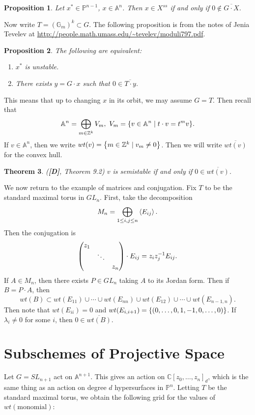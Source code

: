 \documentclass[leqno, openany]{memoir}
\newtheorem{thm}{Theorem}[section]
\newtheorem{prop}[thm]{Proposition}
\theoremstyle{definition}
\theoremstyle{remark}
\theoremstyle{plain}
\theoremstyle{definition}
\theoremstyle{remark}
\newcommand{\A}{\mathbb{A}}
\newcommand{\C}{\mathbb{C}}
\newcommand{\Z}{\mathbb{Z}}
\renewcommand{\P}{\mathbb{P}}
\newcommand{\ol}[1]{\overline{#1}}
\begin{document}
\begin{prop}
    Let $x^* \in \P^{n-1}$, $x \in \A^n$. Then $x \in X^{ss}$ if and only if $0 \notin \ol{G \cdot X}$.
\end{prop}

Now write $T = (\mathbb{G}_m)^k \subset G$. The following proposition is from the notes of Jenia Tevelev at \url{http://people.math.umass.edu/~tevelev/moduli797.pdf}.

\begin{prop}
    The following are equivalent:
    \begin{enumerate}
        \item $x^*$ is unstable.
        \item There exists $y = G \cdot x$ such that $0 \in \ol{T \cdot y}$.
    \end{enumerate}
\end{prop}

This means that up to changing $x$ in its orbit, we may assume $G = T$. Then recall that
\[ \A^n = \bigoplus_{m \in \Z^k} V_m,\ V_m = \qty{v \in \A^n \mid t \cdot v = t^m v}. \]
If $v \in \A^n$, then we write $wt(v) = \qty{m \in \Z^k \mid v_m \neq 0}$. Then we will write $\ol{wt(v)}$ for the convex hull.

\begin{thm}(\textbf{[D]}, Theorem 9.2)
    $v$ is semistable if and only if $0 \in \ol{wt(v)}$.  
\end{thm}

We now return to the example of matrices and conjugation. Fix $T$ to be the standard maximal torus in $GL_n$. First, take the decomposition
\[ M_n = \bigoplus_{1 \leq i,j \leq n} \ev{E_{ij}}. \]
Then the conjugation is
\[ \mqty(\dmat{z_1, \ddots, z_n}) \cdot E_{ij} = z_i z_j^{-1} E_{ij}. \]
If $A \in M_{n}$, then there exists $P \in GL_n$ taking $A$ to its Jordan form. Then if $B = P \cdot A$, then
\[ wt(B) \subset wt(E_{11}) \cup \cdots \cup wt(E_{nn}) \cup wt(E_{12}) \cup \cdots \cup wt(E_{n-1,n}). \]
Then note that $wt(E_{ii}) = \qty{0}$ and $wt(E_{i,i+1}) = \qty{(0, \ldots, 0, 1, -1, 0, \ldots, 0)}$. If $\lambda_i \neq 0$ for some $i$, then $0 \in \ol{wt(B)}$. 

\section{Subschemes of Projective Space}%
\label{sec:hypersurfaces}

Let $G = SL_{n+1}$ act on $\A^{n+1}$. This gives an action on $\C[z_0, \ldots, z_n]_d$, which is the same thing as an action on degree $d$ hypersurfaces in $\P^n$. Letting $T$ be the standard maximal torus, we obtain the following grid for the values of $wt(\text{monomial})$:
\end{document}
